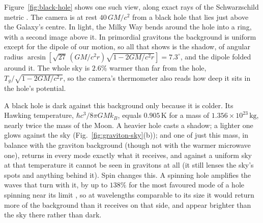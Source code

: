 Figure~\ref{fig:black-hole} shows one such view, along exact rays of the
Schwarzschild metric \cite{Darwin1959,Synge1966,Luminet1979}. The camera is at
rest $40\,GM/c^2$ from a black hole that lies just above the Galaxy's centre.
In light, the Milky Way bends around the hole into a ring, with a second image
above it. In primordial gravitons the background is uniform except for the
dipole of our motion, so all that shows is the shadow, of angular radius
$\arcsin[\sqrt{27}\,(GM/c^2 r)\sqrt{1-2GM/c^2 r}] = 7.3^\circ$, and the
dipole folded around it. The whole sky is $2.6\%$ warmer than far from the
hole, $T_g/\sqrt{1-2GM/c^2 r}$, so the camera's thermometer also reads how deep
it sits in the hole's potential.

A black hole is dark against this background only because it is colder. Its
Hawking temperature, $\hbar c^3/8\pi GMk_B$, equals $0.905\,\mathrm{K}$ for a
mass of $1.356\times10^{23}\,\mathrm{kg}$, nearly twice the mass of the Moon. A
heavier hole casts a shadow; a lighter one glows against the sky
(Fig.~\ref{fig:graviton-sky}(b)); and one of
just this mass, in balance with the graviton background (though not with the
warmer microwave one), returns in every mode exactly what it receives, and
against a uniform sky at that temperature it cannot be seen in gravitons at all
(it still lenses the sky's spots and anything behind it). Spin changes this. A
spinning hole amplifies the waves that turn with it, by up to $138\%$ for the
most favoured mode of a hole spinning near its limit
\cite{TeukolskyPress1974}, so at wavelengths comparable to its size it would
return more of the background than it receives on that side, and appear
brighter than the sky there rather than dark.

